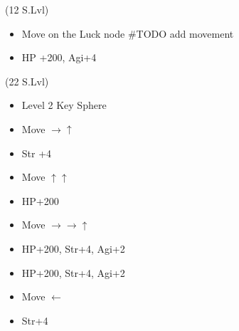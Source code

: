 \begin{spheregrid}
	\begin{itemize}
		\kimahrif (12 S.Lvl)
		\begin{itemize}
			\item Move on the Luck node #TODO add movement
			\item HP +200, Agi+4
		\end{itemize}
		\tidusf (22 S.Lvl)
		\begin{itemize}
			\item Level 2 Key Sphere
			\item Move $\rightarrow\uparrow$
			\item Str +4
			\item Move $\uparrow\uparrow$
			\item HP+200
			\item Move $\rightarrow\rightarrow\uparrow$
			\item HP+200, Str+4, Agi+2
			\item HP+200, Str+4, Agi+2
			\item Move $\leftarrow$
			\item Str+4
		\end{itemize}
	\end{itemize}
\end{spheregrid}
